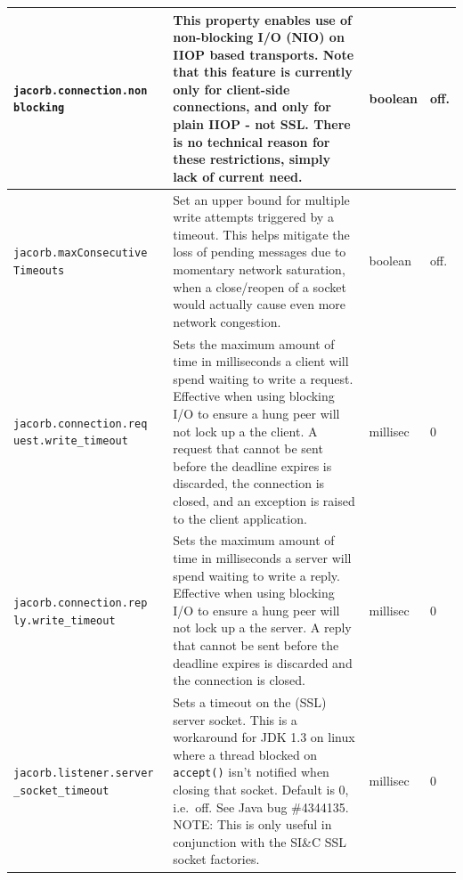 \begin{small}
\begin{longtable}{|p{5cm}|p{7.5cm}|p{1.5cm}|p{1.5cm}|}
\verb"jacorb.connection.non"
\verb"blocking" & This property enables use of non-blocking I/O (NIO) on IIOP
based transports. Note that this feature is currently only for client-side
connections, and only for plain IIOP - not SSL. There is no technical reason
for these restrictions, simply lack of current need. & boolean & off. \\
\hline

\verb"jacorb.maxConsecutive"
\verb"Timeouts" & Set an upper bound for multiple write attempts triggered by a timeout.
This helps mitigate the loss of pending messages due to momentary network
saturation, when a close/reopen of a socket would actually cause even
more network congestion. & boolean & off. \\
\hline

\verb"jacorb.connection.req"
\verb"uest.write_timeout" & Sets the maximum amount of time in milliseconds
a client will spend waiting to write a request. Effective when using blocking
I/O to ensure a hung peer will not lock up a the client. A request that cannot
be sent before the deadline expires is discarded, the connection is closed,
and an exception is raised to the client application. & millisec & 0 \\
\hline

\verb"jacorb.connection.rep"
\verb"ly.write_timeout" & Sets the maximum amount of time in milliseconds
a server will spend waiting to write a reply. Effective when using blocking
I/O to ensure a hung peer will not lock up a the server. A reply that cannot
be sent before the deadline expires is discarded and the connection is
closed. & millisec & 0 \\
\hline

\verb"jacorb.listener.server"
\verb"_socket_timeout" & Sets a timeout on the (SSL) server socket. This is a
workaround for JDK 1.3 on linux where a thread blocked on \verb"accept()"
isn't notified when closing that socket. Default is 0, i.e.~off. See Java bug
\#4344135. NOTE: This is only useful in conjunction with the SI\&C SSL socket
factories. & millisec & 0\\
\hline


\end{longtable}
\end{small}
